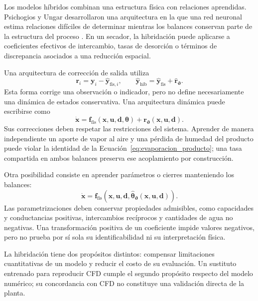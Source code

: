 Los modelos híbridos combinan una estructura física con relaciones aprendidas. Psichogios y Ungar desarrollaron una arquitectura en la que una red neuronal estima relaciones difíciles de determinar mientras los balances conservan parte de la estructura del proceso \cite{psichogios1992}. En un secador, la hibridación puede aplicarse a coeficientes efectivos de intercambio, tasas de desorción o términos de discrepancia asociados a una reducción espacial.

Una arquitectura de corrección de salida utiliza
\begin{equation}
\mathbf r_i=\mathbf y_i-\widehat{\mathbf y}_{\mathrm{fis},i},
\qquad
\widehat{\mathbf y}_{\mathrm{hib}}
=\widehat{\mathbf y}_{\mathrm{fis}}+\widehat{\mathbf r}_{\boldsymbol\vartheta}.
\label{eq:residuo_modelo_fisico}
\end{equation}
Esta forma corrige una observación o indicador, pero no define necesariamente una dinámica de estados conservativa. Una arquitectura dinámica puede escribirse como
\begin{equation}
\dot{\mathbf x}
=\mathbf f_{\mathrm{fis}}(\mathbf x,\mathbf u,\mathbf d,\boldsymbol\theta)
+\mathbf r_{\boldsymbol\vartheta}(\mathbf x,\mathbf u,\mathbf d).
\label{eq:modelo_hibrido_dinamico}
\end{equation}
Sus correcciones deben respetar las restricciones del sistema. Aprender de manera independiente un aporte de vapor al aire y una pérdida de humedad del producto puede violar la identidad de la Ecuación~\eqref{eq:evaporacion_producto}; una tasa compartida en ambos balances preserva ese acoplamiento por construcción.

Otra posibilidad consiste en aprender parámetros o cierres manteniendo los balances:
\begin{equation}
\dot{\mathbf x}
=\mathbf f_{\mathrm{fis}}
\left(\mathbf x,\mathbf u,\mathbf d,
\widehat{\boldsymbol\theta}_{\boldsymbol\vartheta}(\mathbf x,\mathbf u,\mathbf d)\right).
\label{eq:parametros_aprendidos}
\end{equation}
Las parametrizaciones deben conservar propiedades admisibles, como capacidades y conductancias positivas, intercambios recíprocos y cantidades de agua no negativas. Una transformación positiva de un coeficiente impide valores negativos, pero no prueba por sí sola su identificabilidad ni su interpretación física.

La hibridación tiene dos propósitos distintos: compensar limitaciones cuantitativas de un modelo y reducir el costo de su evaluación. Un sustituto entrenado para reproducir CFD cumple el segundo propósito respecto del modelo numérico; su concordancia con CFD no constituye una validación directa de la planta.


